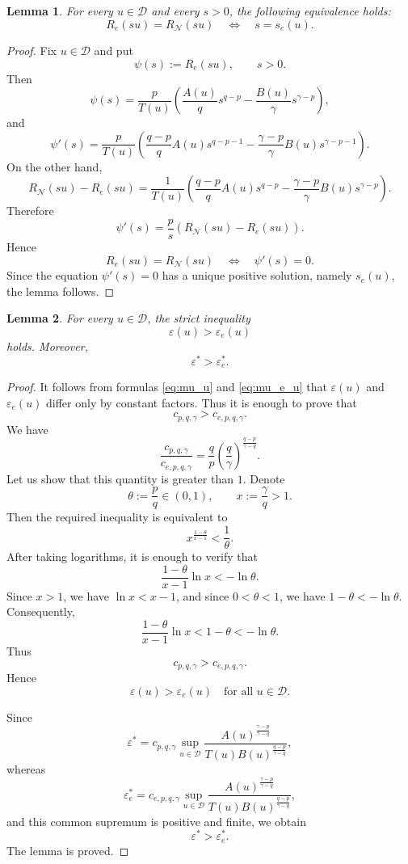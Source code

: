\documentclass[preprint,11pt]{elsarticle}
\numberwithin{equation}{section}
\newtheorem{lemma}{Lemma}[section]
\begin{document}
\begin{lemma}
	\label{lem:inters}
	For every \(u\in\mathcal D\) and every \(s>0\), the following equivalence
	holds:
	\[
	R_e(su)=R_{\mathcal N}(su)
	\quad
	\Longleftrightarrow
	\quad
	s=s_e(u).
	\]
\end{lemma}

\begin{proof}
	Fix \(u\in\mathcal D\) and put
	\[
	\psi(s):=R_e(su),
	\qquad s>0.
	\]
	Then
	\[
	\psi(s)
	=
	\frac{p}{T(u)}
	\left(
	\frac{A(u)}q s^{q-p}
	-
	\frac{B(u)}\gamma s^{\gamma-p}
	\right),
	\]
	and
	\[
	\psi'(s)
	=
	\frac{p}{T(u)}
	\left(
	\frac{q-p}{q}A(u)s^{q-p-1}
	-
	\frac{\gamma-p}{\gamma}B(u)s^{\gamma-p-1}
	\right).
	\]
	On the other hand,
	\[
	R_{\mathcal N}(su)-R_e(su)
	=
	\frac{1}{T(u)}
	\left(
	\frac{q-p}{q}A(u)s^{q-p}
	-
	\frac{\gamma-p}{\gamma}B(u)s^{\gamma-p}
	\right).
	\]
	Therefore
	\[
	\psi'(s)
	=
	\frac{p}{s}
	\left(
	R_{\mathcal N}(su)-R_e(su)
	\right).
	\]
	Hence
	\[
	R_e(su)=R_{\mathcal N}(su)
	\quad
	\Longleftrightarrow
	\quad
	\psi'(s)=0 .
	\]
	Since the equation \(\psi'(s)=0\) has a unique positive solution, namely
	\(s_e(u)\), the lemma follows.
\end{proof}

\begin{lemma}
	\label{lem:eps-greater-eps-e}
	For every \(u\in\mathcal D\), the strict inequality
	\[
	\varepsilon(u)>\varepsilon_e(u)
	\]
	holds. Moreover,
	\[
	\varepsilon^*>\varepsilon_e^* .
	\]
\end{lemma}

\begin{proof}
	It follows from formulas \eqref{eq:mu_u} and \eqref{eq:mu_e_u} that
	\(\varepsilon(u)\) and \(\varepsilon_e(u)\) differ only by constant
	factors. Thus it is enough to prove that
	\[
	c_{p,q,\gamma}
	>
	c_{e,p,q,\gamma}.
	\]
	We have
	\[
	\frac{c_{p,q,\gamma}}
	{c_{e,p,q,\gamma}}
	=
	\frac{q}{p}
	\left(\frac{q}{\gamma}\right)^{
		\frac{q-p}{\gamma-q}
	}.
	\]
	Let us show that this quantity is greater than \(1\). Denote
	\[
	\theta:=\frac{p}{q}\in(0,1),
	\qquad
	x:=\frac{\gamma}{q}>1.
	\]
	Then the required inequality is equivalent to
	\[
	x^{\frac{1-\theta}{x-1}}<\frac1\theta .
	\]
	After taking logarithms, it is enough to verify that
	\[
	\frac{1-\theta}{x-1}\ln x<-\ln\theta .
	\]
	Since \(x>1\), we have \(\ln x<x-1\), and since \(0<\theta<1\), we have
	\(1-\theta<-\ln\theta\). Consequently,
	\[
	\frac{1-\theta}{x-1}\ln x
	<
	1-\theta
	<
	-\ln\theta .
	\]
	Thus
	\[
	c_{p,q,\gamma}
	>
	c_{e,p,q,\gamma}.
	\]
	Hence
	\[
	\varepsilon(u)>\varepsilon_e(u)
	\quad
	\text{for all }u\in\mathcal D.
	\]
	
	Since
	\[
	\varepsilon^*
	=
	c_{p,q,\gamma}
	\sup_{u\in\mathcal D}
	\frac{
		A(u)^{\frac{\gamma-p}{\gamma-q}}
	}{
		T(u)B(u)^{\frac{q-p}{\gamma-q}}
	},
	\]
	whereas
	\[
	\varepsilon_e^*
	=
	c_{e,p,q,\gamma}
	\sup_{u\in\mathcal D}
	\frac{
		A(u)^{\frac{\gamma-p}{\gamma-q}}
	}{
		T(u)B(u)^{\frac{q-p}{\gamma-q}}
	},
	\]
	and this common supremum is positive and finite, we obtain
	\[
	\varepsilon^*>\varepsilon_e^* .
	\]
	The lemma is proved.
\end{proof}
\end{document}

